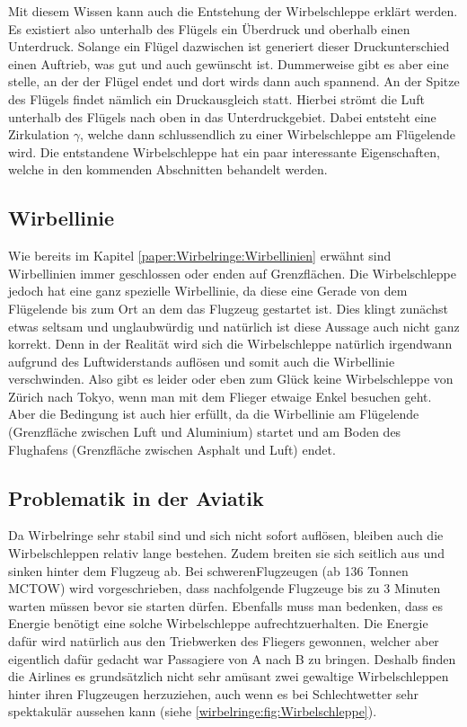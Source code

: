 Mit diesem Wissen kann auch die Entstehung der Wirbelschleppe erklärt werden. 
Es existiert also unterhalb des Flügels ein Überdruck und oberhalb einen Unterdruck.
Solange ein Flügel dazwischen ist generiert dieser Druckunterschied einen Auftrieb, was gut und auch gewünscht ist.
Dummerweise gibt es aber eine stelle, an der der Flügel endet und dort wirds dann auch spannend.
An der Spitze des Flügels findet nämlich ein Druckausgleich statt.
Hierbei strömt die Luft unterhalb des Flügels nach oben in das Unterdruckgebiet. 
Dabei entsteht eine Zirkulation $\gamma$, welche dann schlussendlich zu einer Wirbelschleppe am Flügelende wird.
Die entstandene Wirbelschleppe hat ein paar interessante Eigenschaften, welche in den kommenden Abschnitten behandelt werden.

\subsection{Wirbellinie}
Wie bereits im Kapitel \ref{paper:Wirbelringe:Wirbellinien} erwähnt sind Wirbellinien immer geschlossen oder enden auf Grenzflächen.
Die Wirbelschleppe jedoch hat eine ganz spezielle Wirbellinie, da diese eine Gerade von dem Flügelende bis zum Ort an dem das Flugzeug gestartet ist.
Dies klingt zunächst etwas seltsam und unglaubwürdig und natürlich ist diese Aussage auch nicht ganz korrekt.
Denn in der Realität wird sich die Wirbelschleppe natürlich irgendwann aufgrund des Luftwiderstands auflösen und somit auch die Wirbellinie verschwinden.
Also gibt es leider oder eben zum Glück keine Wirbelschleppe von Zürich nach Tokyo, wenn man mit dem Flieger etwaige Enkel besuchen geht.
Aber die Bedingung ist auch hier erfüllt, da die Wirbellinie am Flügelende (Grenzfläche zwischen Luft und Aluminium) startet und am Boden des Flughafens (Grenzfläche zwischen Asphalt und Luft) endet.

\subsection{Problematik in der Aviatik}
Da Wirbelringe sehr stabil sind und sich nicht sofort auflösen, bleiben auch die Wirbelschleppen relativ lange bestehen.
Zudem breiten sie sich seitlich aus und sinken hinter dem Flugzeug ab.
Bei \glqq schweren\grqq Flugzeugen (ab 136 Tonnen MCTOW)\cite{Wirbelringe:WakeTurbulence} wird vorgeschrieben, dass nachfolgende Flugzeuge bis zu 3 Minuten warten müssen bevor sie starten dürfen.
Ebenfalls muss man bedenken, dass es Energie benötigt eine solche Wirbelschleppe aufrechtzuerhalten.
Die Energie dafür wird natürlich aus den Triebwerken des Fliegers gewonnen, welcher aber eigentlich dafür gedacht war Passagiere von A nach B zu bringen.
Deshalb finden die Airlines es grundsätzlich nicht sehr amüsant zwei gewaltige Wirbelschleppen hinter ihren Flugzeugen herzuziehen, auch wenn es bei Schlechtwetter sehr spektakulär aussehen kann (siehe \ref{wirbelringe:fig:Wirbelschleppe}). %